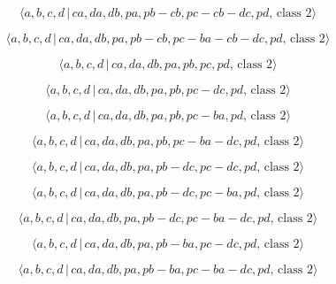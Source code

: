 \documentclass[10pt]{article}
\begin{document}
\begin{equation}
\langle a,b,c,d\,|\,ca,da,db,pa,pb-cb,pc-cb-dc,pd,\,\text{class }2\rangle 
\tag{7.3097}
\end{equation}

\begin{equation}
\langle a,b,c,d\,|\,ca,da,db,pa,pb-cb,pc-ba-cb-dc,pd,\,\text{class }2\rangle
\tag{7.3098}
\end{equation}

\begin{equation}
\langle a,b,c,d\,|\,ca,da,db,pa,pb,pc,pd,\,\text{class }2\rangle 
\tag{7.3099}
\end{equation}

\begin{equation}
\langle a,b,c,d\,|\,ca,da,db,pa,pb,pc-dc,pd,\,\text{class }2\rangle 
\tag{7.3100}
\end{equation}

\begin{equation}
\langle a,b,c,d\,|\,ca,da,db,pa,pb,pc-ba,pd,\,\text{class }2\rangle 
\tag{7.3101}
\end{equation}

\begin{equation}
\langle a,b,c,d\,|\,ca,da,db,pa,pb,pc-ba-dc,pd,\,\text{class }2\rangle 
\tag{7.3102}
\end{equation}

\begin{equation}
\langle a,b,c,d\,|\,ca,da,db,pa,pb-dc,pc-dc,pd,\,\text{class }2\rangle 
\tag{7.3103}
\end{equation}

\begin{equation}
\langle a,b,c,d\,|\,ca,da,db,pa,pb-dc,pc-ba,pd,\,\text{class }2\rangle 
\tag{7.3104}
\end{equation}

\begin{equation}
\langle a,b,c,d\,|\,ca,da,db,pa,pb-dc,pc-ba-dc,pd,\,\text{class }2\rangle 
\tag{7.3105}
\end{equation}

\begin{equation}
\langle a,b,c,d\,|\,ca,da,db,pa,pb-ba,pc-dc,pd,\,\text{class }2\rangle 
\tag{7.3106}
\end{equation}

\begin{equation}
\langle a,b,c,d\,|\,ca,da,db,pa,pb-ba,pc-ba-dc,pd,\,\text{class }2\rangle 
\tag{7.3107}
\end{equation}
\end{document}

